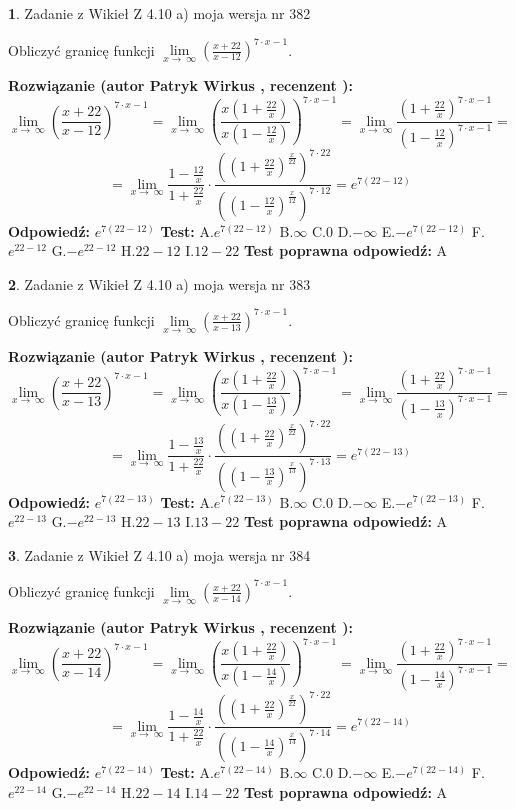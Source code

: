 \documentclass[12pt, a4paper]{article}
\theoremstyle{definition} %
\newtheorem{zad}{}
\newcommand{\zadStart}[1]{\begin{zad}#1\newline}
\newcommand{\zadStop}{\end{zad}}
\newcommand{\rozwStart}[2]{\noindent \textbf{Rozwiązanie (autor #1 , recenzent #2): }\newline}
\newcommand{\rozwStop}{\newline}
\newcommand{\odpStart}{\noindent \textbf{Odpowiedź:}\newline}
\newcommand{\odpStop}{\newline}
\newcommand{\testStart}{\noindent \textbf{Test:}\newline}
\newcommand{\testStop}{\newline}
\newcommand{\kluczStart}{\noindent \textbf{Test poprawna odpowiedź:}\newline}
\newcommand{\kluczStop}{\newline}
\begin{document}
\zadStart{Zadanie z Wikieł Z 4.10 a) moja wersja nr 382}


Obliczyć granicę funkcji  $\lim\limits_{x\to\ \infty}(\frac{x+22}{x-12})^{7\cdot x-1}$.
\zadStop
\rozwStart{Patryk Wirkus}{}
$$\lim\limits_{x\to\ \infty}(\frac{x+22}{x-12})^{7\cdot x-1} = \lim\limits_{x\to\ \infty}(\frac{x(1+\frac{22}{x})}{x(1-\frac{12}{x})})^{7\cdot x-1}=\lim\limits_{x\to\ \infty}\frac{(1+\frac{22}{x})^{7\cdot x-1}}{(1-\frac{12}{x})^{7\cdot x-1}}=$$
$$=\lim\limits_{x\to\ \infty}\frac{1-\frac{12}{x}}{1+\frac{22}{x}}\cdot\frac{((1+\frac{22}{x})^{\frac{x}{22}})^{7\cdot22}}{((1-\frac{12}{x})^{\frac{x}{12}})^{7\cdot12}}=e^{7(22-12)}$$
\rozwStop
\odpStart
$e^{7(22-12)}$
\odpStop
\testStart
A.$e^{7(22-12)}$ B.$\infty$ C.$0$ D.$-\infty$ E.$-e^{7(22-12)}$
F.$e^{22-12}$ G.$-e^{22-12}$
H.$22-12$
I.$12-22$
\testStop
\kluczStart
A
\kluczStop



\zadStart{Zadanie z Wikieł Z 4.10 a) moja wersja nr 383}


Obliczyć granicę funkcji  $\lim\limits_{x\to\ \infty}(\frac{x+22}{x-13})^{7\cdot x-1}$.
\zadStop
\rozwStart{Patryk Wirkus}{}
$$\lim\limits_{x\to\ \infty}(\frac{x+22}{x-13})^{7\cdot x-1} = \lim\limits_{x\to\ \infty}(\frac{x(1+\frac{22}{x})}{x(1-\frac{13}{x})})^{7\cdot x-1}=\lim\limits_{x\to\ \infty}\frac{(1+\frac{22}{x})^{7\cdot x-1}}{(1-\frac{13}{x})^{7\cdot x-1}}=$$
$$=\lim\limits_{x\to\ \infty}\frac{1-\frac{13}{x}}{1+\frac{22}{x}}\cdot\frac{((1+\frac{22}{x})^{\frac{x}{22}})^{7\cdot22}}{((1-\frac{13}{x})^{\frac{x}{13}})^{7\cdot13}}=e^{7(22-13)}$$
\rozwStop
\odpStart
$e^{7(22-13)}$
\odpStop
\testStart
A.$e^{7(22-13)}$ B.$\infty$ C.$0$ D.$-\infty$ E.$-e^{7(22-13)}$
F.$e^{22-13}$ G.$-e^{22-13}$
H.$22-13$
I.$13-22$
\testStop
\kluczStart
A
\kluczStop



\zadStart{Zadanie z Wikieł Z 4.10 a) moja wersja nr 384}


Obliczyć granicę funkcji  $\lim\limits_{x\to\ \infty}(\frac{x+22}{x-14})^{7\cdot x-1}$.
\zadStop
\rozwStart{Patryk Wirkus}{}
$$\lim\limits_{x\to\ \infty}(\frac{x+22}{x-14})^{7\cdot x-1} = \lim\limits_{x\to\ \infty}(\frac{x(1+\frac{22}{x})}{x(1-\frac{14}{x})})^{7\cdot x-1}=\lim\limits_{x\to\ \infty}\frac{(1+\frac{22}{x})^{7\cdot x-1}}{(1-\frac{14}{x})^{7\cdot x-1}}=$$
$$=\lim\limits_{x\to\ \infty}\frac{1-\frac{14}{x}}{1+\frac{22}{x}}\cdot\frac{((1+\frac{22}{x})^{\frac{x}{22}})^{7\cdot22}}{((1-\frac{14}{x})^{\frac{x}{14}})^{7\cdot14}}=e^{7(22-14)}$$
\rozwStop
\odpStart
$e^{7(22-14)}$
\odpStop
\testStart
A.$e^{7(22-14)}$ B.$\infty$ C.$0$ D.$-\infty$ E.$-e^{7(22-14)}$
F.$e^{22-14}$ G.$-e^{22-14}$
H.$22-14$
I.$14-22$
\testStop
\kluczStart
A
\kluczStop
\end{document}
